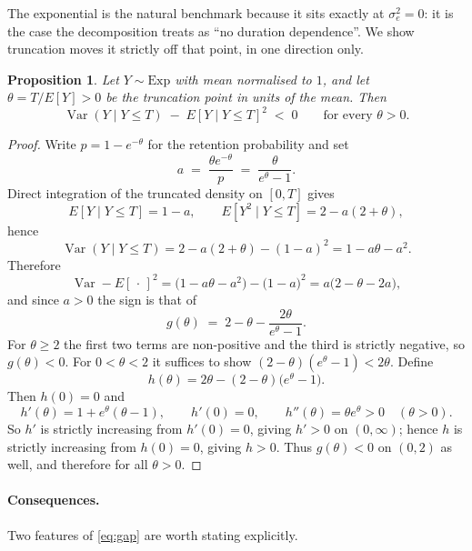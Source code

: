 \documentclass[11pt,a4paper]{article}
\newtheorem{proposition}{Proposition}
\begin{document}
The exponential is the natural benchmark because it sits exactly at
$\sigma^2_e = 0$: it is the case the decomposition treats as ``no duration
dependence''.  We show truncation moves it strictly off that point, in one
direction only.

\begin{proposition}
Let $Y \sim \mathrm{Exp}$ with mean normalised to $1$, and let
$\theta = T/E[Y] > 0$ be the truncation point in units of the mean.  Then
\[
  \operatorname{Var}(Y \mid Y \le T) \;-\; E[Y \mid Y \le T]^2 \;<\; 0
  \qquad\text{for every } \theta > 0 .
\]
\end{proposition}

\begin{proof}
Write $p = 1 - e^{-\theta}$ for the retention probability and set
\[
  a \;=\; \frac{\theta e^{-\theta}}{p} \;=\; \frac{\theta}{e^{\theta}-1}.
\]
Direct integration of the truncated density on $[0,T]$ gives
\[
  E[Y \mid Y \le T] = 1 - a,
  \qquad
  E[Y^2 \mid Y \le T] = 2 - a(2+\theta),
\]
hence
\[
  \operatorname{Var}(Y \mid Y\le T)
   = 2 - a(2+\theta) - (1-a)^2
   = 1 - a\theta - a^2 .
\]
Therefore
\begin{equation}
  \operatorname{Var} - E[\,\cdot\,]^2
   = \bigl(1 - a\theta - a^2\bigr) - \bigl(1 - a\bigr)^2
   = a\bigl(2 - \theta - 2a\bigr),
  \label{eq:gap}
\end{equation}
and since $a > 0$ the sign is that of
\[
  g(\theta) \;=\; 2 - \theta - \frac{2\theta}{e^{\theta}-1}.
\]
For $\theta \ge 2$ the first two terms are non-positive and the third is
strictly negative, so $g(\theta) < 0$.  For $0 < \theta < 2$ it suffices to
show $(2-\theta)(e^{\theta}-1) < 2\theta$.  Define
\[
  h(\theta) = 2\theta - (2-\theta)\bigl(e^{\theta}-1\bigr).
\]
Then $h(0) = 0$ and
\[
  h'(\theta) = 1 + e^{\theta}(\theta - 1),
  \qquad h'(0) = 0,
  \qquad h''(\theta) = \theta e^{\theta} > 0
  \quad (\theta > 0).
\]
So $h'$ is strictly increasing from $h'(0)=0$, giving $h' > 0$ on
$(0,\infty)$; hence $h$ is strictly increasing from $h(0)=0$, giving
$h > 0$.  Thus $g(\theta) < 0$ on $(0,2)$ as well, and therefore for all
$\theta > 0$.
\end{proof}

\paragraph{Consequences.}
Two features of \eqref{eq:gap} are worth stating explicitly.
\end{document}

